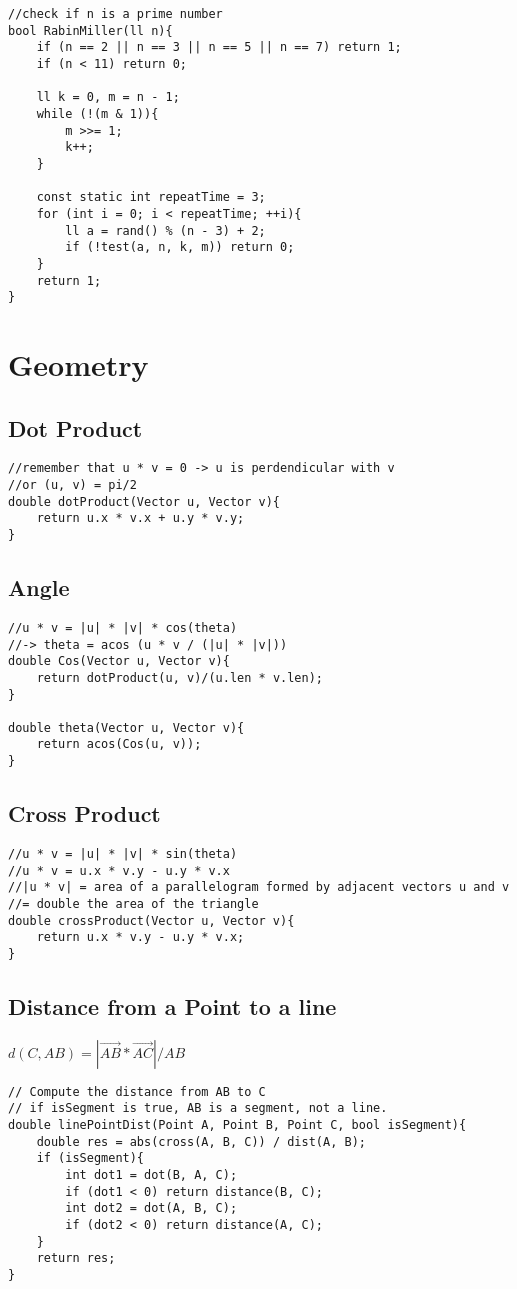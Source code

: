 \documentclass[11pt,a4paper]{article}
\begin{document}
\begin{multicols*}{2}
\begin{lstlisting}
//check if n is a prime number
bool RabinMiller(ll n){
    if (n == 2 || n == 3 || n == 5 || n == 7) return 1;
    if (n < 11) return 0;

    ll k = 0, m = n - 1;
    while (!(m & 1)){
        m >>= 1;
        k++;
    }

    const static int repeatTime = 3;
    for (int i = 0; i < repeatTime; ++i){
        ll a = rand() % (n - 3) + 2;
        if (!test(a, n, k, m)) return 0;
    }
    return 1;
}
\end{lstlisting}

\section{Geometry}
\subsection{Dot Product}
\begin{lstlisting}
//remember that u * v = 0 -> u is perdendicular with v
//or (u, v) = pi/2
double dotProduct(Vector u, Vector v){
    return u.x * v.x + u.y * v.y; 
}
\end{lstlisting}
\subsection{Angle}
\begin{lstlisting}
//u * v = |u| * |v| * cos(theta)
//-> theta = acos (u * v / (|u| * |v|))
double Cos(Vector u, Vector v){
    return dotProduct(u, v)/(u.len * v.len);
}

double theta(Vector u, Vector v){
    return acos(Cos(u, v));
}
\end{lstlisting}

\subsection{Cross Product}
\begin{lstlisting}
//u * v = |u| * |v| * sin(theta)
//u * v = u.x * v.y - u.y * v.x
//|u * v| = area of a parallelogram formed by adjacent vectors u and v 
//= double the area of the triangle 
double crossProduct(Vector u, Vector v){
    return u.x * v.y - u.y * v.x;
}
\end{lstlisting}

\subsection{Distance from a Point to a line}
$d(C, AB) = |\vec{AB} * \vec{AC}|/AB $
\begin{lstlisting}
// Compute the distance from AB to C
// if isSegment is true, AB is a segment, not a line.
double linePointDist(Point A, Point B, Point C, bool isSegment){
    double res = abs(cross(A, B, C)) / dist(A, B);
    if (isSegment){
        int dot1 = dot(B, A, C);
        if (dot1 < 0) return distance(B, C);
        int dot2 = dot(A, B, C);
        if (dot2 < 0) return distance(A, C);
    }
    return res;
}
\end{lstlisting}


\end{multicols*}
\end{document}
